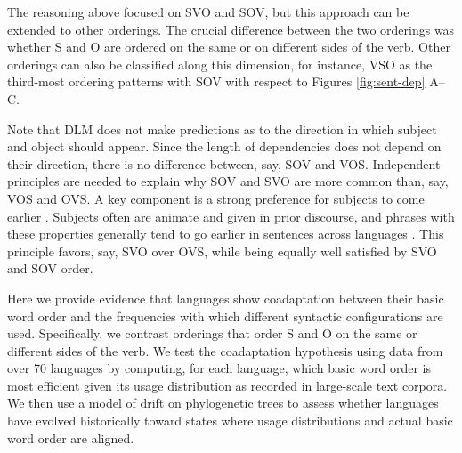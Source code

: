 \documentclass[11pt,a4paper]{article}
\newcommand\comment[1]{{\color{red}#1}}
\begin{document}
The reasoning above focused on SVO and SOV, but this approach can be extended to other orderings.
The crucial difference between the two orderings was whether S and O are ordered on the same or on different sides of the verb.
Other orderings can also be classified along this dimension, for instance, VSO as the third-most ordering patterns with SOV with respect to Figures \ref{fig:sent-dep} A--C.

Note that DLM does not make predictions as to the direction in which subject and object should appear. Since the length of dependencies does not depend on their direction, there is no difference between, say, SOV and VOS.
Independent principles are needed to explain why SOV and SVO are more common than, say, VOS and OVS.
A key component is a strong preference for subjects to come earlier \citep{wals-81}.
Subjects often are animate and given in prior discourse, and phrases with these properties generally tend to go earlier in sentences across languages \citep{prince1981toward, mcdonald1993word}.
This principle favors, say, SVO over OVS, while being equally well satisfied by SVO and SOV order.

Here we provide evidence that languages show coadaptation between their basic word order and the frequencies with which different syntactic configurations are used.
Specifically, we contrast orderings that order S and O on the same or different sides of the verb. We test the coadaptation hypothesis using data from over 70 languages by computing, for each language, which basic word order is most efficient given its usage distribution as recorded in large-scale text corpora. We then use a model of drift on phylogenetic trees to assess whether languages have evolved historically toward states where usage distributions and actual basic word order are aligned.







\end{document}

